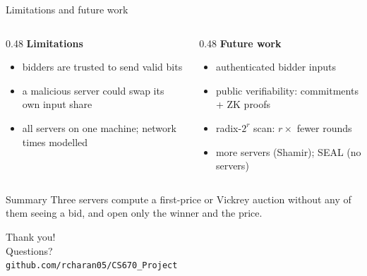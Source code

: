 \documentclass[aspectratio=169,11pt]{beamer}
\begin{document}
\begin{frame}{Limitations and future work}
  \begin{columns}[T]
    \begin{column}{0.48\textwidth}
      \textbf{Limitations}
      \begin{itemize}
        \item bidders are trusted to send valid bits
        \item a malicious server could swap its own input share
        \item all servers on one machine; network times modelled
      \end{itemize}
    \end{column}
    \begin{column}{0.48\textwidth}
      \textbf{Future work}
      \begin{itemize}
        \item authenticated bidder inputs
        \item public verifiability: commitments + ZK proofs
        \item radix-$2^r$ scan: $r\times$ fewer rounds
        \item more servers (Shamir); SEAL (no servers)
      \end{itemize}
    \end{column}
  \end{columns}
  \bigskip
  \begin{exampleblock}{Summary}
    Three servers compute a first-price or Vickrey auction without any of them seeing a bid,
    and open only the winner and the price.
  \end{exampleblock}
\end{frame}

\begin{frame}[standout]
  Thank you!\\[10pt]
  \normalsize Questions?\\[14pt]
  \footnotesize \texttt{github.com/rcharan05/CS670\_Project}
\end{frame}
\end{document}
